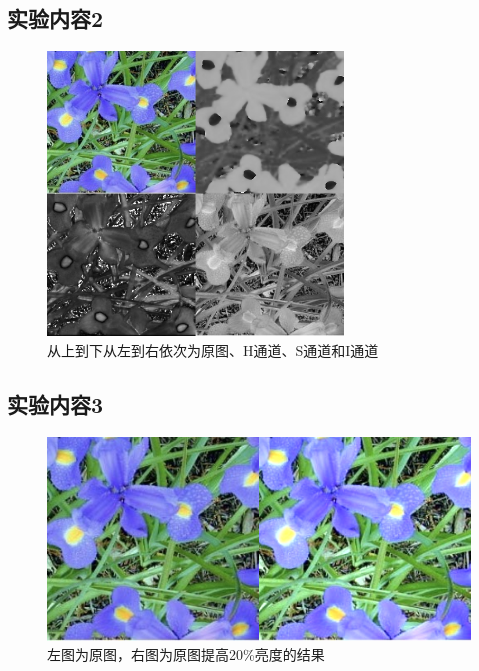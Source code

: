 \documentclass[a4paper]{ctexart}
\begin{document}
  \subsection*{实验内容2}
  \begin{figure}[H]
    \centering
      \includegraphics*[width=0.7\textwidth]{fig/H-S-I.png}
      \caption{从上到下从左到右依次为原图、H通道、S通道和I通道}
  \end{figure}
  \subsection*{实验内容3}
  \begin{figure}[H]
    \centering
      \includegraphics*[width=1\textwidth]{fig/bright20.png}
      \caption{左图为原图，右图为原图提高20\%亮度的结果}
  \end{figure}
\end{document}
